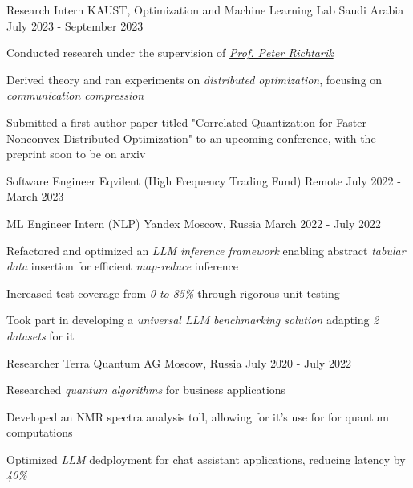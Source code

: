 
\begin{cventries}
  \cventry
    {Research Intern}
    {KAUST, Optimization and Machine Learning Lab}
    {Saudi Arabia}
    {July 2023 - September 2023}
    {
      \begin{cvitems}
        \item {Conducted research under the supervision of  \href{https://richtarik.org/}{\textit{Prof. Peter Richtarik}}}
        \item {Derived theory and ran experiments on \textit{distributed optimization}, focusing on \textit{communication compression}}
        \item {Submitted a first-author paper titled "Correlated Quantization for Faster Nonconvex Distributed Optimization" to an upcoming conference, with the preprint soon to be on arxiv}
      \end{cvitems}
    }

  \cventry
    {Software Engineer}
    {Eqvilent (High Frequency Trading Fund)}
    {Remote}
    {July 2022 - March 2023}
    {}

  \cventry
    {ML Engineer Intern (NLP)}
    {Yandex}
    {Moscow, Russia}
    {March 2022 - July 2022}
    {
      \begin{cvitems} %
        \item {Refactored and optimized an \textit{LLM inference framework} enabling abstract \textit{tabular data} insertion for efficient \textit{map-reduce} inference}
        \item {Increased test coverage from \textit{0 to 85\%} through rigorous unit testing}
        \item {Took part in developing a \textit{universal LLM benchmarking solution} adapting \textit{2 datasets} for it}
      \end{cvitems}
    }
    
  \cventry
    {Researcher} %
    {Terra Quantum AG} %
    {Moscow, Russia} %
    {July 2020 - July 2022} %
    {
      \begin{cvitems} %
        \item { Researched \textit{quantum algorithms} for business applications }
        \item { Developed an {NMR spectra} analysis toll, allowing for it's use for  for quantum computations }
        \item { Optimized \textit{LLM} dedployment for chat assistant applications, reducing latency by \textit{40\%} }
      \end{cvitems}
    }
    
\end{cventries}
